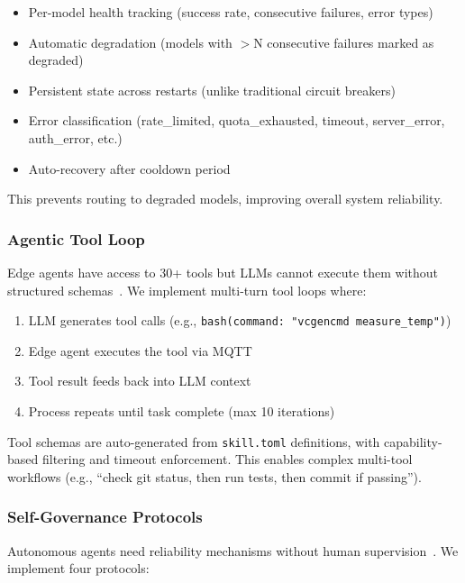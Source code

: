 \documentclass{article}
\begin{document}
\begin{itemize}[leftmargin=*]
    \item Per-model health tracking (success rate, consecutive failures, error types)
    \item Automatic degradation (models with $>$N consecutive failures marked as degraded)
    \item Persistent state across restarts (unlike traditional circuit breakers)
    \item Error classification (rate\_limited, quota\_exhausted, timeout, server\_error, auth\_error, etc.)
    \item Auto-recovery after cooldown period
\end{itemize}

This prevents routing to degraded models, improving overall system reliability.

\subsubsection{Agentic Tool Loop}

Edge agents have access to 30+ tools but LLMs cannot execute them without structured schemas~\cite{schick2023toolformer}. We implement multi-turn tool loops where:

\begin{enumerate}[leftmargin=*]
    \item LLM generates tool calls (e.g., \texttt{bash(command: "vcgencmd measure\_temp")})
    \item Edge agent executes the tool via MQTT
    \item Tool result feeds back into LLM context
    \item Process repeats until task complete (max 10 iterations)
\end{enumerate}

Tool schemas are auto-generated from \texttt{skill.toml} definitions, with capability-based filtering and timeout enforcement. This enables complex multi-tool workflows (e.g., ``check git status, then run tests, then commit if passing'').

\subsubsection{Self-Governance Protocols}

Autonomous agents need reliability mechanisms without human supervision~\cite{shinn2024reflexion}. We implement four protocols:
\end{document}
